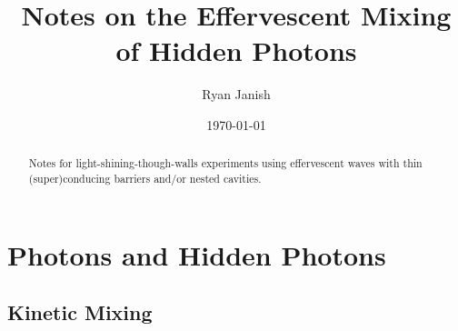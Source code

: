 \documentclass[prd,longbibliography,nofootinbib]{revtex4-2}
\begin{document}

\title{Notes on the Effervescent Mixing of Hidden Photons}
\author{Ryan Janish}
\date{\today}

\begin{abstract}
Notes for light-shining-though-walls experiments using effervescent waves with thin (super)conducing barriers and/or nested cavities. 
\end{abstract}

\maketitle


\section{Photons and Hidden Photons}

\subsection{Kinetic Mixing}
\end{document}
